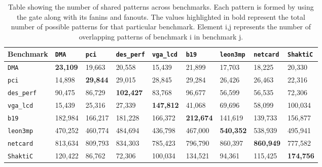


\begin{table}[!t]
\centering
    \caption{Table showing the number of shared patterns across benchmarks. Each pattern is formed by using the gate along with its fanins and fanouts. The values highlighted in bold represent the total number of possible patterns for that particular benchmark. Element i,j represents the number of overlapping patterns of benchmark i in benchmark j.}
    \label{Tab:tab1}

    \begin{tabular}{ |p{2.2cm}| p{1cm}| p{1.2cm}| p{1.7cm} |p{1.4cm} | p{1.2cm}|p{1.4cm}|p{1.4cm}|p{1.4cm}|}
\hline
        \textbf{ Benchmark} & \texttt{DMA} & \texttt{pci} &\texttt{des\_perf} &\texttt{vga\_lcd} &\texttt{b19} &\texttt{leon3mp} &\texttt{netcard} & \texttt{ShaktiC} \\ \hline
    \texttt{DMA}       & \textbf{23,109} & 19,663          & 20,558           & 15,439           & 21,899           & 17,703           & 18,225           & 20,330           \\ \hline
\texttt{pci}       & 14,898          & \textbf{29,844} & 29,015           & 28,845           & 29,284           & 26,426           & 26,463           & 22,316           \\ \hline
\texttt{des\_perf} & 90,475          & 86,729          & \textbf{102,427} & 83,768           & 96,677           & 56,599           & 56,535           & 72,306           \\ \hline
\texttt{vga\_lcd}  & 15,439          & 25,316          & 27,339           & \textbf{147,812} & 41,068           & 69,696           & 58,099           & 100,034          \\ \hline
\texttt{b19}       & 182,984         & 166,217         & 181,228          & 166,372          & \textbf{212,674} & 141,619          & 139,733          & 156,877          \\ \hline
\texttt{leon3mp}   & 470,252         & 460,774         & 484,694          & 436,798          & 467,000          & \textbf{540,352} & 538,939          & 495,941          \\ \hline
\texttt{netcard}   & 813,634         & 809,793         & 834,303          & 785,423          & 796,790          & 860,397          & \textbf{860,949} & 777,582          \\ \hline
\texttt{ShaktiC}   & 120,422         & 86,762          & 72,306           & 100,034          & 134,521          & 94,361           & 115,425          & \textbf{174,756} \\ \hline
 \end{tabular}
    
\centering

\end{table}



